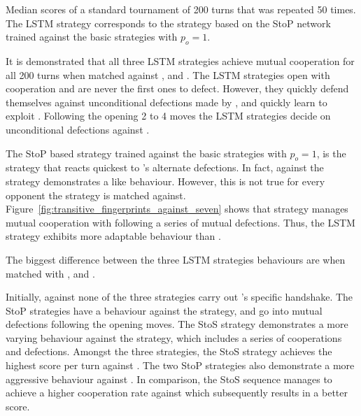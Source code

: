\begin{table}[!htbp]
    \begin{center}
    \resizebox{\textwidth}{!}{
        
    }
\end{center}
\caption{Median scores of a standard tournament of 200 turns that was repeated
50 times. The LSTM strategy corresponds to the strategy based on the StoP
network trained against the basic strategies with
$p_o=1$.}\label{table:scores_s_to_p_basic_against_seven}
\end{table}

It is demonstrated that all three LSTM strategies achieve mutual cooperation for
all 200 turns when matched against \TitForTat, \Gradual and \Cooperator. The LSTM
strategies open with cooperation and are never the first ones to defect.
However, they quickly defend themselves against unconditional defections made by
\Defector, and quickly learn to exploit \Alternator. Following the opening 2 to 4
moves the LSTM strategies decide on unconditional defections against \Alternator.

The StoP based strategy trained against the basic strategies with $p_o=1$, is
the strategy that reacts quickest to \Alternator's alternate defections. In
fact, against \Alternator the strategy demonstrates a \Grudger like behaviour.
However, this is not true for every opponent the strategy is matched against.
Figure~\ref{fig:transitive_fingerprints_against_seven} shows that strategy
manages mutual cooperation with \Adaptive following a series of mutual
defections. Thus, the LSTM strategy exhibits more adaptable behaviour than
\Grudger.

The biggest difference between the three LSTM strategies behaviours are when
matched with \ZDExtortTwo, \TFOne and \Adaptive.

Initially, against \TFOne none of the three strategies carry out \TFOne's specific
handshake. The StoP strategies have a \Grudger behaviour against the strategy,
and go into mutual defections following the opening moves. The StoS strategy
demonstrates a more varying behaviour against the strategy, which includes a
series of cooperations and defections. Amongst the three strategies, the StoS
strategy achieves the highest score per turn against \TFOne. The two StoP
strategies also demonstrate a more aggressive behaviour against \ZDExtortTwo. In
comparison, the StoS sequence manages to achieve a higher cooperation rate
against \ZDExtortTwo which subsequently results in a better score.

